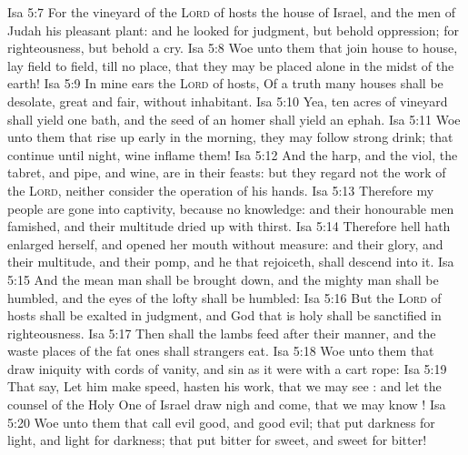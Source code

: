 \vs Isa 5:7 For the vineyard of the \textsc{Lord} of hosts  the house of Israel, and the men of Judah his pleasant plant: and he looked for judgment, but behold oppression; for righteousness, but behold a cry.
\vs Isa 5:8 Woe unto them that join house to house,  lay field to field, till  no place, that they may be placed alone in the midst of the earth!
\vs Isa 5:9 In mine ears  the \textsc{Lord} of hosts, Of a truth many houses shall be desolate,  great and fair, without inhabitant.
\vs Isa 5:10 Yea, ten acres of vineyard shall yield one bath, and the seed of an homer shall yield an ephah.
\vs Isa 5:11 Woe unto them that rise up early in the morning,  they may follow strong drink; that continue until night,  wine inflame them!
\vs Isa 5:12 And the harp, and the viol, the tabret, and pipe, and wine, are in their feasts: but they regard not the work of the \textsc{Lord}, neither consider the operation of his hands.
\vs Isa 5:13 Therefore my people are gone into captivity, because  no knowledge: and their honourable men  famished, and their multitude dried up with thirst.
\vs Isa 5:14 Therefore hell hath enlarged herself, and opened her mouth without measure: and their glory, and their multitude, and their pomp, and he that rejoiceth, shall descend into it.
\vs Isa 5:15 And the mean man shall be brought down, and the mighty man shall be humbled, and the eyes of the lofty shall be humbled:
\vs Isa 5:16 But the \textsc{Lord} of hosts shall be exalted in judgment, and God that is holy shall be sanctified in righteousness.
\vs Isa 5:17 Then shall the lambs feed after their manner, and the waste places of the fat ones shall strangers eat.
\vs Isa 5:18 Woe unto them that draw iniquity with cords of vanity, and sin as it were with a cart rope:
\vs Isa 5:19 That say, Let him make speed,  hasten his work, that we may see : and let the counsel of the Holy One of Israel draw nigh and come, that we may know !
\vs Isa 5:20 Woe unto them that call evil good, and good evil; that put darkness for light, and light for darkness; that put bitter for sweet, and sweet for bitter!

